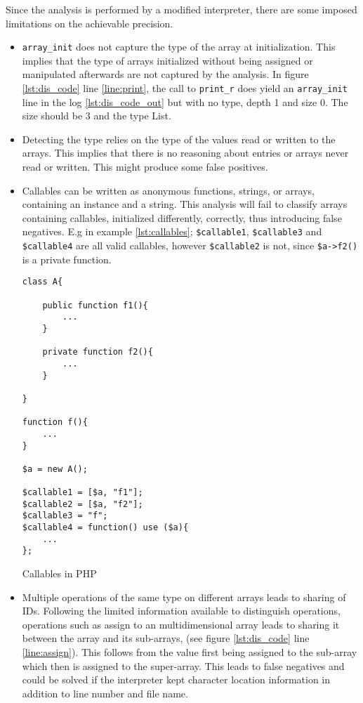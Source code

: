 Since the analysis is performed by a modified interpreter, there are some imposed limitations on the achievable precision. 

\begin{itemize}
\item  \texttt{array\_init} does not capture the type of the array at initialization. This implies that the type of arrays initialized without being assigned or manipulated afterwards are not captured by the analysis. In figure \ref{lst:dis_code} line \ref{line:print}, the call to \texttt{print\_r} does yield an \texttt{array\_init} line in the log \ref{lst:dis_code_out} but with no type, depth 1 and size 0. The size should be 3 and the type List.

\item Detecting the type relies on the type of the values read or written to the arrays. This implies that there is no reasoning about entries or arrays never read or written. This might produce some false positives.

\item Callables can be written as anonymous functions, strings, or arrays, containing an instance and a string. This analysis will fail to classify arrays containing callables, initialized differently, correctly, thus introducing false negatives. E.g in example \ref{lst:callables}; \texttt{\$callable1}, \texttt{\$callable3} and \texttt{\$callable4} are all valid callables, however \texttt{\$callable2} is not, since \texttt{\$a->f2()} is a private function.

\begin{program}
\centering
\begin{lstlisting}
class A{

    public function f1(){
        ...
    }

    private function f2(){
        ...
    }

}

function f(){
    ...
}

$a = new A();

$callable1 = [$a, "f1"];
$callable2 = [$a, "f2"];
$callable3 = "f";
$callable4 = function() use ($a){
    ...
};
\end{lstlisting}
\caption{Callables in PHP}
\label{lst:callables}
\end{program}

\item Multiple operations of the same type on different arrays leads to sharing of IDs. Following the limited information available to distinguish operations, operations such as assign to an multidimensional array leads to sharing it between the array and its sub-arrays, (see figure \ref{lst:dis_code} line \ref{line:assign}). This follows from the value first being assigned to the sub-array which then is assigned to the super-array. This leads to false negatives and could be solved if the interpreter kept character location information in addition to line number and file name.   

\end{itemize}




